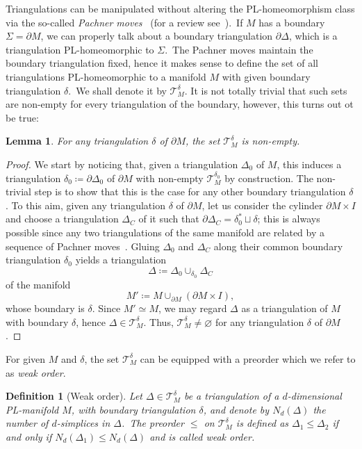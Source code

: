 \documentclass[11pt]{article}
\newtheorem{lemma}[proposition]{Lemma}
\newtheorem{definition}{Definition}[section]
\theoremstyle{definition}
\numberwithin{equation}{section}
\begin{document}
Triangulations can be manipulated without altering the PL-homeomorphism class via the so-called \textit{Pachner moves}~\cite{Pachner_1991} (for a review see~\cite{Lickorish_1999}).~If $M$ has a boundary $\Sigma=\partial M$, we can properly talk about a boundary triangulation $\partial\Delta$, which is a triangulation PL-homeomorphic to $\Sigma$.~The Pachner moves maintain the boundary triangulation fixed, hence it makes sense to define the set of all triangulations PL-homeomorphic to a manifold $M$ with given boundary triangulation $\delta$.~We shall denote it by $\mathcal{T}_M^{\delta}$. 
It is not totally trivial that such sets are non-empty for every triangulation of the boundary, however, this turns out ot be true:
\begin{lemma}
\label{lem:nonemptyT}
For any triangulation $\delta$ of $\partial M$, the set 
$\mathcal{T}_M^\delta$ is non-empty.
\end{lemma}
\begin{proof}
We start by noticing that, given a triangulation $\Delta_0$ of $M$, this induces a triangulation $\delta_0 \coloneqq  \partial \Delta_0$ of $\partial M$ with non-empty $\mathcal T_M^{\delta_0}$ by construction. The non-trivial step is to show that this is the case for any other boundary triangulation $\delta$. To this aim, given any triangulation $\delta$ of $\partial M$, let us consider the cylinder $\partial M \times I$ and choose a triangulation $\Delta_C$ of it such that 
$\partial \Delta_C = \delta_0^* \sqcup \delta$; this is always possible since any two triangulations of the same manifold are related by a sequence of Pachner moves~\cite{Hellmann_2011,Barrett_Westbury_1996}. Gluing $\Delta_0$ and $\Delta_C$ along their common boundary triangulation $\delta_0$ yields a triangulation 
\[
\Delta \coloneqq  \Delta_0 \cup_{\delta_0} \Delta_C
\]
of the manifold
\[
M' \coloneqq  M \cup_{\partial M} (\partial M \times I),
\]
whose boundary is $\delta$. Since $M' \simeq M$, we may regard $\Delta$ as a triangulation of $M$ with boundary $\delta$, hence $\Delta \in \mathcal{T}_M^\delta$. Thus, $\mathcal{T}_M^\delta\neq\varnothing$ for any triangulation $\delta$ of $\partial M$.
\end{proof}
\noindent
For given $M$ and $\delta$, the set $\mathcal{T}_M^{\delta}$ can be equipped with a preorder which we refer to as \emph{weak order}.
\begin{definition}[Weak order]
    Let $\Delta\in \mathcal{T}_M^{\delta}$ be a triangulation of a $d$-dimensional PL-manifold $M$, with boundary triangulation $\delta$, and denote by $N_d(\Delta)$ the number of $d$-simplices in $\Delta$.~The preorder $\leq$ on $\mathcal{T}_M^{\delta}$ is defined as $\Delta_1\leq\Delta_2$ if and only if $N_d(\Delta_1)\leq N_d(\Delta)$ and is called \emph{weak order}.
\end{definition}
\end{document}
